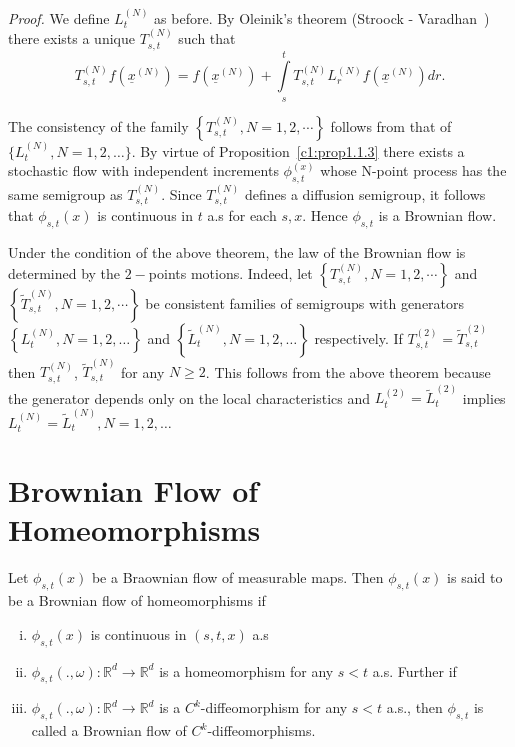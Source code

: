 \noindent \textit{Proof.}
  We define $L^{(N)}_t$ as before. By Oleinik's theorem
  (Stroock - Varadhan~\cite{31}) there exists a unique $T^{(N)}_{s, t}$ such
  that 
  \begin{equation*}
  T^{(N)}_{s,t} f(\underline{x}^{(N)})= f(\underline{x}^{(N)}) +
  \int\limits_s^t T^{(N)}_{s,t} 
L^{(N)}_r  f(\underline{x}^{(N)})dr. \tag*{$\Box$}
  \end{equation*}

  The consistency of the family $\left\{ T^{(N)}_{s,t}, N =
  1,2,\cdots\right\}$ follows from that of $\{ L^{(N)}_t, N =
  1,2,\dots\}$. By virtue of Proposition~\ref{c1:prop1.1.3} there exists a
  stochastic flow with independent increments $\phi_{s,t}^{(x)}$ whose
  N-point process has the same semigroup as $T^{(N)}_{s,t}$. Since
  $T^{(N)}_{s,t}$ defines a diffusion semigroup, it follows that
  $\phi_{s,t}(x)$ is continuous in $t$ a.s for each $s,x$. Hence
  $\phi _{s,t}$ is a Brownian flow. 

\setcounter{remark}{8}
\begin{remark}\label{c1:rem1.2.9}%
  Under the condition of the above theorem, the law of the Brownian
  flow is determined by the $2-$points motions. Indeed, let  $\left\{
  T^{(N)}_{s,t}, N = 1,2,\cdots\right\}$ and\pageoriginale $\left\{ \tilde{T}^{(N)}_{s,t}, N =
  1,2,\cdots\right\}$ be consistent families of semigroups with generators
  $\left\{ L^{(N)}_t, N = 1,2,\dots\right\}$ and $\left\{ \tilde{L}^{(N)}_t, N =
  1,2,\dots\right\}$ respectively. If $T^{(2)}_{s,t} = \tilde{T}^{(2)}_{s,t}
  $ then $T^{(N)}_{s,t}$, $\tilde{T}^{(N)}_{s,t} $ for any $N \ge
  2$. This follows from the above theorem because the generator
  depends only on the local characteristics and $L^{(2)}_t =
  \tilde{L}^{(2)}_t$ implies  $L^{(N)}_t = \tilde{L}^{(N)}_t, N= 1,2,
  \dots$ 
\end{remark}

\section{Brownian Flow of Homeomorphisms}\label{chap1:sec1.3}%

\begin{definition}\label{c1:def1.3.1}%
  Let $\phi_{s,t} (x)$ be a Braownian flow of measurable maps. Then
  $\phi_{s,t}{(x)}$ is said to be a Brownian flow of homeomorphisms if 
\end{definition}

\begin{enumerate}[(i)]
\item $\phi_{s,t} {(x)}$ is continuous in $(s,t,x)$ a.s

\item $\phi_{s,t} (., \omega):\mathbb{R}^d \to \mathbb{R}^d$ is a
  homeomorphism for any $s<t$ a.s. Further if 

\item $\phi_{s,t} (., \omega):\mathbb{R}^d \to \mathbb{R}^d$  is a
  $C^k$-diffeomorphism for any $s < t$ a.s., then $\phi_{s,t}$ is
  called a Brownian flow of $C^k$-diffeomorphisms. 
\end{enumerate}

